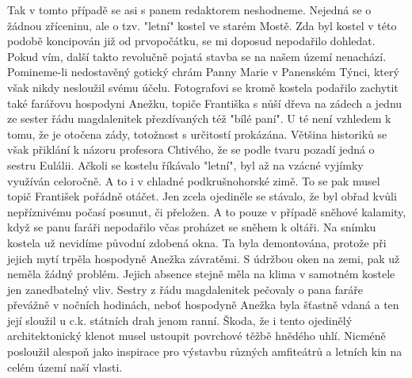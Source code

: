 
Tak v tomto případě se asi s panem redaktorem neshodneme. Nejedná se o
žádnou zříceninu, ale o tzv. "letní" kostel ve starém Mostě. Zda byl
kostel v této podobě koncipován již od prvopočátku, se mi doposud
nepodařilo dohledat. Pokud vím, další takto revolučně pojatá stavba se
na našem území nenachází. Pomineme-li nedostavěný gotický chrám Panny
Marie v Panenském Týnci, který však nikdy nesloužil svému účelu.
Fotografovi se kromě kostela podařilo zachytit také farářovu hospodyni
Anežku, topiče Františka s nůší dřeva na zádech a jednu ze sester řádu
magdalenitek přezdívaných též "bílé paní". U té není vzhledem k tomu,
že je otočena zády, totožnost s určitostí prokázána. Většina historiků
se však přiklání k názoru profesora Chtivého, že se podle tvaru pozadí
jedná o sestru Eulálii. Ačkoli se kostelu říkávalo "letní", byl až na
vzácné vyjímky využíván celoročně. A to i v chladné podkrušnohorské
zimě. To se pak musel topič František pořádně otáčet. Jen zcela
ojediněle se stávalo, že byl obřad kvůli nepříznivému počasí posunut,
či přeložen. A to pouze v případě sněhové kalamity, když se panu
faráři nepodařilo včas proházet se sněhem k oltáři. Na snímku kostela
už nevidíme původní zdobená okna. Ta byla demontována, protože při
jejich mytí trpěla hospodyně Anežka závratěmi. S údržbou oken na zemi,
pak už neměla žádný problém. Jejich absence stejně měla na klima v
samotném kostele jen zanedbatelný vliv. Sestry z řádu magdalenitek
pečovaly o pana faráře převážně v nočních hodinách, neboť hospodyně
Anežka byla šťastně vdaná a ten její sloužil u c.k. státních drah
jenom ranní. Škoda, že i tento ojedinělý architektonický klenot musel
ustoupit povrchové těžbě hnědého uhlí. Nicméně posloužil alespoň jako
inspirace pro výstavbu různých amfiteátrů a letních kin na celém území
naší vlasti.

